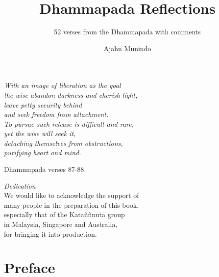 \documentclass{aruno-gist}
\title{Dhammapada Reflections}
\subtitle{52 verses from the Dhammapada with comments}
\author{Ajahn Munindo}
\date{}
\begin{document}
\thispagestyle{empty}
\mbox{}
\pagecolor[gray]{0.7}
\newpage
\thispagestyle{empty}
\pagecolor{white}
\mbox{}
\newpage


\frontmatter*
\pagestyle{empty}

\midsloppy

\cleartorecto
\begin{quotepage}{60mm}
\centering
\itshape
With an image of liberation as the goal\\
the wise abandon darkness and cherish light,\\
leave petty security behind \\
and seek freedom from attachment.\\
To pursue such release is difficult and rare, \\
yet the wise will seek it, \\
detaching themselves from obstructions,\\
purifying heart and mind.

{\smaller Dhammapada verses 87-88}
\end{quotepage}

\cleartoverso
\begin{quotepage}{80mm}
\centering
\textit{Dedication}\\[0.4\baselineskip]
We would like to acknowledge the support of\\
many people in the preparation of this book,\\
especially that of the Kataññnutā group\\
in Malaysia, Singapore and Australia,\\
for bringing it into production.

\end{quotepage}

\cleartorecto
\thispagestyle{empty}


\cleartoverso
\thispagestyle{empty}



\chapter{Preface}



\mainmatter*

\cleartorecto
\thispagestyle{empty}
{\centering

\vspace*{0.6\textheight}
{\chapNameFont\LARGE\color{chaptitle}}

}
\end{document}
